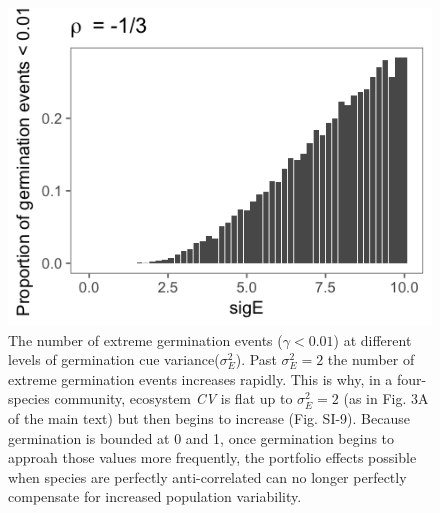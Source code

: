 \documentclass[11pt,]{article}
\begin{document}
\newpage{}

\begin{figure}[!ht]
  \centering
      \includegraphics[width=5in]{./components/SI_big_sigE_gradient_extreme_events.png}
  \caption{The number of extreme germination events ($\gamma<0.01$) at different levels of germination cue variance($\sigma_E^2$). Past $\sigma_E^2=2$ the number of extreme germination events increases rapidly. This is why, in a four-species community, ecosystem \emph{CV} is flat up to $\sigma_E^2=2$ (as in Fig. 3A of the main text) but then begins to increase (Fig. SI-9). Because germination is bounded at 0 and 1, once germination begins to approah those values more frequently, the portfolio effects possible when species are perfectly anti-correlated can no longer perfectly compensate for increased population variability.}
\end{figure}

\newpage{}
\end{document}
